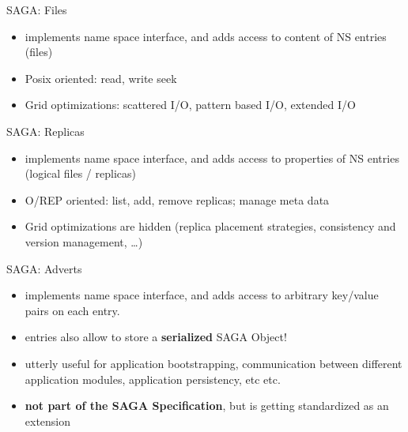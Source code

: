 \documentclass[%
  pdf,
  colorBG,
  slideColor,
  frames,
  ogf
]{prosper}
\newcommand{\B}[1]{\textbf{#1}}
\newcommand{\dn}{\vspace*{+1em}}
\begin{document}

 \begin{slide}{SAGA: Files}

 \dn 

  \begin{itemize}
   \item implements name space interface, and adds access to content of NS
         entries (files)
   \item Posix oriented: read, write seek
   \item Grid optimizations: scattered I/O, pattern based I/O, extended I/O
  \end{itemize}

 \end{slide}


 \begin{slide}{SAGA: Replicas}

 \dn 

  \begin{itemize}
   \item implements name space interface, and adds access to properties of NS
         entries (logical files / replicas)
   \item O/REP oriented: list, add, remove replicas; manage meta data
   \item Grid optimizations are hidden (replica placement strategies,
         consistency and version management, \dots)
  \end{itemize}

 \end{slide}


 \begin{slide}{SAGA: Adverts}

 \dn 

  \begin{itemize}
   \item implements name space interface, and adds access to 
         arbitrary key/value pairs on each entry.  
   \item entries also allow to store a \B{serialized} SAGA Object!
   \item utterly useful for application bootstrapping,
   communication between different application modules,
   application persistency, etc etc.
   \item \B{not part of the SAGA Specification}, but is getting
   standardized as an extension
  \end{itemize}

 \end{slide}
\end{document}
